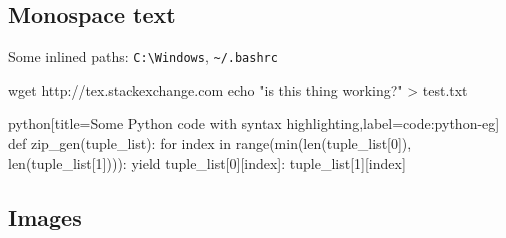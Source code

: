 \subsection{Monospace text}

Some inlined paths: \lstinline{C:\Windows}, \lstinline{~/.bashrc} %

\begin{cmd}[title={Some command-line commands},label=code:linux-cmd,every listing line={\$\#>\ }]
wget http://tex.stackexchange.com
echo "is this thing working?" > test.txt
\end{cmd}

\begin{code}[firstnumber=11]{python}[title={Some Python code with syntax highlighting},label=code:python-eg]
def zip_gen(tuple_list):
    for index in range(min(len(tuple_list[0]), len(tuple_list[1]))):
        yield {tuple_list[0][index]: tuple_list[1][index]}
\end{code}

\subsection{Images}

